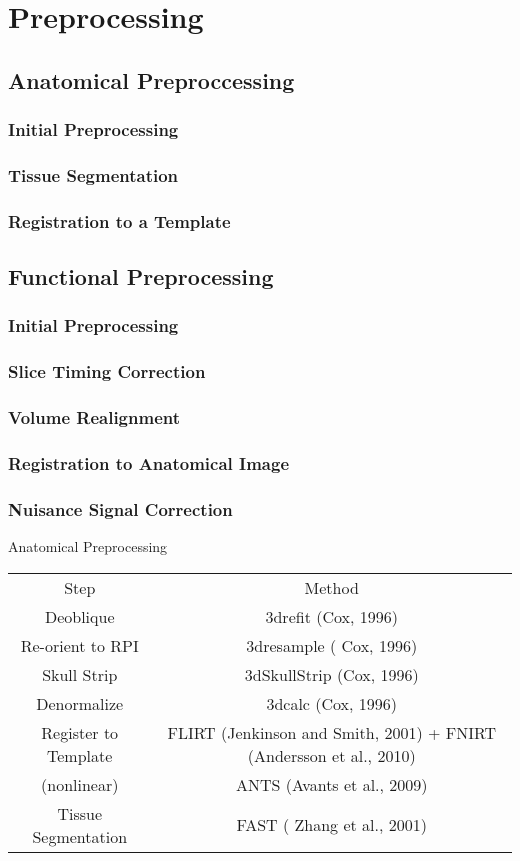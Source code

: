 \section*{Preprocessing}
\subsection{Anatomical Preproccessing}
\subsubsection{Initial Preprocessing}
\subsubsection{Tissue Segmentation}
\subsubsection{Registration to a Template}
\subsection{Functional Preprocessing}
\subsubsection{Initial Preprocessing}
\subsubsection{Slice Timing Correction}
\subsubsection{Volume Realignment}
\subsubsection{Registration to Anatomical Image}
\subsubsection{Nuisance Signal Correction}

Anatomical Preprocessing \\

\begin{tabular}{c c}
	\hline
	Step & Method  \\
	Deoblique & 3drefit (Cox, 1996)  \\
	Re-orient to RPI & 3dresample ( Cox, 1996) \\
	Skull Strip & 3dSkullStrip (Cox, 1996) \\
	Denormalize & 3dcalc (Cox, 1996) \\
	Register to Template & FLIRT (Jenkinson and Smith, 2001) + FNIRT (Andersson et al., 2010) \\
	(nonlinear) & ANTS (Avants et al., 2009)  \\
	Tissue Segmentation & FAST ( Zhang et al., 2001)\\ 
	\hline
\end{tabular}

